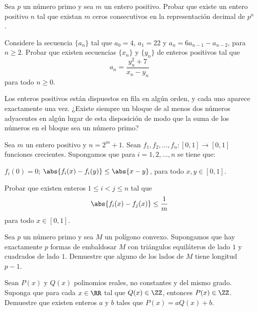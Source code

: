 \begin{problem}
	Sea $p$ un número primo y sea $m$ un entero positivo. Probar que existe un entero positivo $n$ tal que existan $m$ ceros consecutivos en la representación decimal de $p^n$.
\end{problem}

\begin{problem}
	Considere la secuencia $\{a_n\}$ tal que $a_0=4$, $a_1=22$ y $a_n=6a_{n-1}-a_{n-2}$, para $n\ge 2$. Probar que existen secuencias $\{x_n\}$ y $\{y_n\}$ de enteros positivos tal que
	\[a_n=\frac{y_n^2+7}{x_n-y_n}\]
	para todo $n\ge 0$.
\end{problem}

\begin{problem}
	Los enteros positivos están dispuestos en fila en algún orden, y cada uno aparece exactamente una vez. ¿Existe siempre un bloque de al menos dos números adyacentes en algún lugar de esta disposición de modo que la suma de los números en el bloque sea un número primo?
\end{problem}

\begin{problem}
	Sea $m$ un entero positivo y $n=2^m+1$. Sean $f_1,f_2,\dots,f_n:[0,1]\to[0,1]$ funciones crecientes. Supongamos que para $i=1,2,\dots,n$ se tiene que:
	\begin{enumerate}[(i)]
		\ii $f_i(0)=0$;
		\ii $\abs{f_i(x)-f_i(y)}\le\abs{x-y}$, para todo $x,y\in[0,1]$.
	\end{enumerate}
	Probar que existen enteros $1\le i<j\le n$ tal que
	\[\abs{f_i(x)-f_j(x)}\le\frac1m\]
	para todo $x\in[0,1]$.
\end{problem}

\begin{problem}
	Sea $p$ un número primo y sea $M$ un polígono convexo. Supongamos que hay exactamente $p$ formas de embaldosar $M$ con triángulos equiláteros de lado $1$ y cuadrados de lado $1$. Demuestre que alguno de los lados de $M$ tiene longitud $p-1$.
\end{problem}

\begin{problem}
	Sean $P(x)$ y $Q(x)$ polinomios reales, no constantes y del mismo grado. Suponga que para cada $x\in\RR$ tal que $Q(x)\in\ZZ$, entonces $P(x)\in\ZZ$. Demuestre que existen enteros $a$ y $b$ tales que $P(x)=aQ(x)+b$.
\end{problem}


